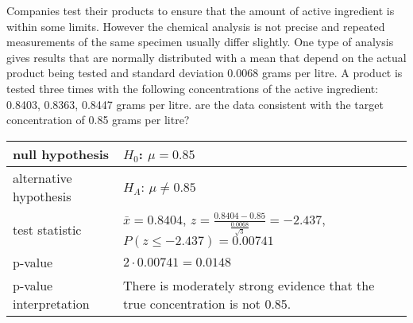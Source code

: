 \begin{example}
    Companies test their products to ensure that the amount of active ingredient is within some limits. However the chemical analysis is not precise and repeated measurements of the same specimen usually differ slightly. One type of analysis gives results that are normally distributed with a mean that depend on the actual product being tested and standard deviation 0.0068 grams per litre. A product is tested three times with the following concentrations of the active ingredient: 0.8403, 0.8363, 0.8447 grams per litre. are the data consistent with the target concentration of 0.85 grams per litre?
    \begin{center}
       \begin{tabular}{p{4cm}|p{7cm}}
            null hypothesis & $H_0$: $\mu=0.85$ \\
            \hline
            alternative hypothesis & $H_A$: $\mu\neq 0.85$ \\
            \hline
            test statistic & $\bar{x} = 0.8404$, $z=\frac{0.8404-0.85}{\frac{0.0068}{\sqrt{3}}} = -2.437$, $P(z\le -2.437) = 0.00741$ \\
            \hline
            p-value & $2\cdot 0.00741 = 0.0148$ \\
            \hline
            p-value interpretation & There is moderately strong evidence that the true concentration is not 0.85.
       \end{tabular}
    \end{center}
	\begin{center}
	\end{center}
\end{example}


